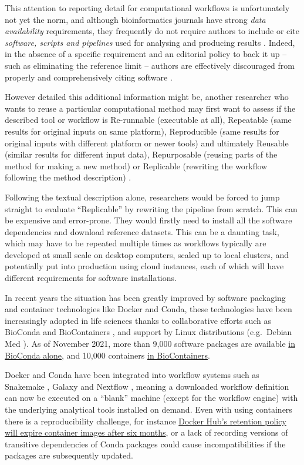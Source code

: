 {This attention to reporting detail for computational workflows is
unfortunately not yet the norm, and although bioinformatics journals
have strong \emph{data availability} requirements, they frequently do
not require authors to include or cite \emph{software, scripts and
pipelines} used for analysing and producing results \cite{ch5-108}.
Indeed, in the absence of a specific requirement and an editorial policy
to back it up -- such as eliminating the reference limit -- authors are
effectively discouraged from properly and comprehensively citing
software \cite{ch5-53}.

However detailed this additional information might be, another
researcher who wants to reuse a particular computational method may
first want to assess if the described tool or workflow is Re-runnable
(executable at all), Repeatable (same results for original inputs on
same platform), Reproducible (same results for original inputs with
different platform or newer tools) and ultimately Reusable (similar
results for different input data), Repurposable (reusing parts of the
method for making a new method) or Replicable (rewriting the workflow
following the method description)
\cite{Benureau 2017,ch5-54}.

Following the textual description alone, researchers would be forced to
jump straight to evaluate ``Replicable'' by rewriting the pipeline from
scratch. This can be expensive and error-prone. They would firstly need
to install all the software dependencies and download reference
datasets. This can be a daunting task, which may have to be repeated
multiple times as workflows typically are developed at small scale on
desktop computers, scaled up to local clusters, and potentially put into
production using cloud instances, each of which will have different
requirements for software installations.

In recent years the situation has been greatly improved by software
packaging and container technologies like Docker and Conda, these
technologies have been increasingly adopted in life sciences
\cite{ch5-90} thanks to
collaborative efforts such as BioConda
\cite{ch5-61} and
BioContainers
\cite{da Veiga Leprevost 2017}, and
support by Linux distributions (e.g.~Debian Med
\cite{ch5-89}). As of
November 2021, more than 9,000 software packages are available
\href{https://anaconda.org/bioconda/}{in BioConda alone}, and 10,000
containers \href{https://biocontainers.pro/\#/registry}{in
BioContainers}.

Docker and Conda have been integrated into workflow systems such as
Snakemake
\cite{ch5-73}, Galaxy
\cite{Afgan 2018} and Nextflow
\cite{Di Tommaso 2017}, meaning a downloaded
workflow definition can now be executed on a ``blank'' machine (except
for the workflow engine) with the underlying analytical tools installed
on demand. Even with using containers there is a reproducibility
challenge, for instance
\href{https://www.docker.com/blog/docker-hub-image-retention-policy-delayed-and-subscription-updates/}{Docker
Hub's retention policy will expire container images after six months},
or a lack of recording versions of transitive dependencies of Conda
packages could cause incompatibilities if the packages are subsequently
updated.

}
